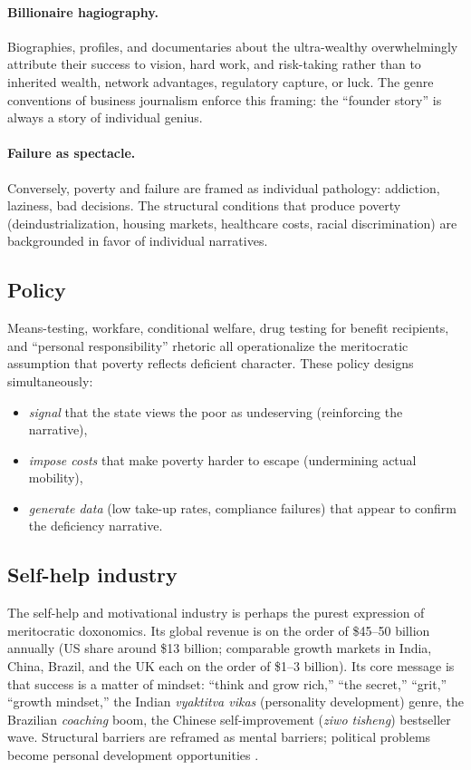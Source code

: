 \paragraph{Billionaire hagiography.}
Biographies, profiles, and documentaries about the ultra-wealthy overwhelmingly attribute their success to vision, hard work, and risk-taking rather than to inherited wealth, network advantages, regulatory capture, or luck.
The genre conventions of business journalism enforce this framing: the ``founder story'' is always a story of individual genius.

\paragraph{Failure as spectacle.}
Conversely, poverty and failure are framed as individual pathology: addiction, laziness, bad decisions.
The structural conditions that produce poverty (deindustrialization, housing markets, healthcare costs, racial discrimination) are backgrounded in favor of individual narratives.

\subsection{Policy}

Means-testing, workfare, conditional welfare, drug testing for benefit recipients, and ``personal responsibility'' rhetoric all operationalize the meritocratic assumption that poverty reflects deficient character.
These policy designs simultaneously:
\begin{itemize}[nosep]
  \item \emph{signal} that the state views the poor as undeserving (reinforcing the narrative),
  \item \emph{impose costs} that make poverty harder to escape (undermining actual mobility),
  \item \emph{generate data} (low take-up rates, compliance failures) that appear to confirm the deficiency narrative.
\end{itemize}

\subsection{Self-help industry}

The self-help and motivational industry is perhaps the purest expression of meritocratic doxonomics. Its global revenue is on the order of \$45--50 billion annually (US share around \$13 billion; comparable growth markets in India, China, Brazil, and the UK each on the order of \$1--3 billion).
Its core message is that success is a matter of mindset: ``think and grow rich,'' ``the secret,'' ``grit,'' ``growth mindset,'' the Indian \emph{vyaktitva vikas} (personality development) genre, the Brazilian \emph{coaching} boom, the Chinese self-improvement (\emph{ziwo tisheng}) bestseller wave.
Structural barriers are reframed as mental barriers; political problems become personal development opportunities \autocite{ehrenreich2009}.

